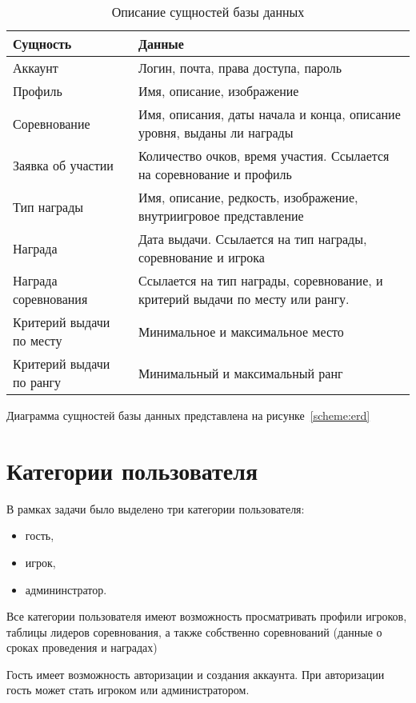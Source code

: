 \begin{table}[h!]
	\caption{\label{tbl:dataop}Описание сущностей базы данных}
	\begin{tabular}{|l|p{8cm}|}
		\hline
		Сущность & Данные \\\hline
		Аккаунт & Логин, почта, права доступа, пароль \\\hline
		Профиль & Имя, описание, изображение \\\hline
		Соревнование & Имя, описания, даты начала и конца, описание уровня, выданы ли награды \\\hline
		Заявка об участии & Количество очков, время участия. Ссылается на соревнование и профиль \\\hline
		Тип награды & Имя, описание, редкость, изображение, внутриигровое представление\\\hline
		Награда & Дата выдачи. Ссылается на тип награды, соревнование и игрока \\\hline
		Награда соревнования & Ссылается на тип награды, соревнование, и критерий выдачи по месту или рангу.\\\hline
		Критерий выдачи по месту & Минимальное и максимальное место \\\hline
		Критерий выдачи по рангу & Минимальный и максимальный ранг \\\hline
	\end{tabular}
\end{table}
\FloatBarrier
Диаграмма сущностей базы данных представлена на рисунке~\ref{scheme:erd}

\FloatBarrier
\section{Категории пользователя}

В рамках задачи было выделено три категории пользователя:
\begin{itemize}
	\item гость,
	\item игрок,
	\item админинстратор.
\end{itemize}

Все категории пользователя имеют возможность просматривать профили игроков, таблицы лидеров соревнования, а также собственно соревнований (данные о сроках проведения и наградах)

Гость имеет возможность авторизации и создания аккаунта. При авторизации гость может стать игроком или администратором.

